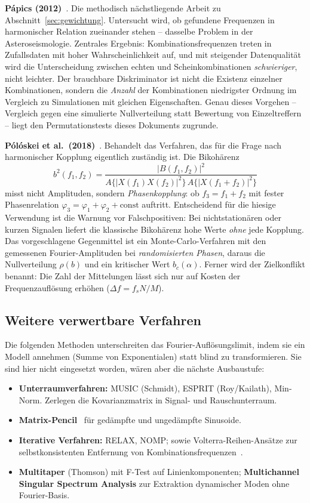 \textbf{P\'apics (2012)}~\cite{papics2012}. Die
methodisch n\"achstliegende Arbeit zu Abschnitt~\ref{sec:gewichtung}.
Untersucht wird, ob gefundene Frequenzen in harmonischer Relation
zueinander stehen -- dasselbe Problem in der Asteroseismologie.
Zentrales Ergebnis: Kombinationsfrequenzen treten in Zufallsdaten mit
hoher Wahrscheinlichkeit auf, und mit steigender Datenqualit\"at wird
die Unterscheidung zwischen echten und Scheinkombinationen
\emph{schwieriger}, nicht leichter. Der brauchbare Diskriminator ist
nicht die Existenz einzelner Kombinationen, sondern die \emph{Anzahl}
der Kombinationen niedrigster Ordnung im Vergleich zu Simulationen mit
gleichen Eigenschaften. Genau dieses Vorgehen -- Vergleich gegen eine
simulierte Nullverteilung statt Bewertung von Einzeltreffern -- liegt
den Permutationstests dieses Dokuments zugrunde.

\textbf{P\'ol\'oskei et al.\ (2018)}~\cite{poloskei2018}. Behandelt
das Verfahren, das f\"ur die Frage nach harmonischer Kopplung
eigentlich zust\"andig ist. Die Bikoh\"arenz
\[
  b^2(f_1,f_2) = \frac{|B(f_1,f_2)|^2}
  {A\{|X(f_1)X(f_2)|^2\}\,A\{|X(f_1{+}f_2)|^2\}}
\]
misst nicht Amplituden, sondern \emph{Phasenkopplung}: ob
$f_3 = f_1 + f_2$ mit fester Phasenrelation
$\varphi_3 = \varphi_1 + \varphi_2 + \text{const}$ auftritt.
Entscheidend f\"ur die hiesige Verwendung ist die Warnung vor
Falschpositiven: Bei nichtstation\"aren oder kurzen Signalen liefert die
klassische Bikoh\"arenz hohe Werte \emph{ohne} jede Kopplung. Das
vorgeschlagene Gegenmittel ist ein Monte-Carlo-Verfahren mit den
gemessenen Fourier-Amplituden bei \emph{randomisierten Phasen}, daraus
die Nullverteilung $\rho(b)$ und ein kritischer Wert $b_c(\alpha)$.
Ferner wird der Zielkonflikt benannt: Die Zahl der Mittelungen l\"asst
sich nur auf Kosten der Frequenzaufl\"osung erh\"ohen
($\Delta f = f_s N/M$).

\subsection{Weitere verwertbare Verfahren}

Die folgenden Methoden unterschreiten das Fourier-Aufl\"osungslimit,
indem sie ein Modell annehmen (Summe von Exponentialen) statt blind zu
transformieren. Sie sind hier nicht eingesetzt worden, w\"aren aber die
n\"achste Ausbaustufe:

\begin{itemize}
  \item \textbf{Unterraumverfahren:} MUSIC (Schmidt), ESPRIT
    (Roy/Kailath), Min-Norm. Zerlegen die Kovarianzmatrix in Signal-
    und Rauschunterraum.
  \item \textbf{Matrix-Pencil}~\cite{hua1990} f\"ur ged\"ampfte und unged\"ampfte Sinusoide.
  \item \textbf{Iterative Verfahren:} RELAX, NOMP; sowie
    Volterra-Reihen-Ans\"atze zur selbstkonsistenten Entfernung von
    Kombinationsfrequenzen~\cite{lares2020}.
  \item \textbf{Multitaper} (Thomson) mit F-Test auf Linienkomponenten;
    \textbf{Multichannel Singular Spectrum Analysis} zur Extraktion
    dynamischer Moden ohne Fourier-Basis.
\end{itemize}

